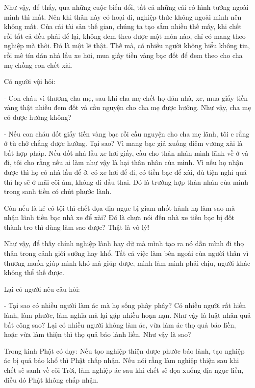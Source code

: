 \documentclass[
  12pt,
  oneside]{book}
\begin{document}
Như vậy, để thấy, qua những cuộc biến đổi, tất cả những cái có hình tướng ngoài mình thì mất. Nên khi thân này có hoại đi, nghiệp thức không ngoài mình nên không mất. Của cải tài sản thế gian, chúng ta tạo sắm nhiều thế mấy, khi chết rồi tất cả đều phải để lại, không đem theo được một món nào, chỉ có mang theo nghiệp mà thôi. Đó là một lẽ thật. Thế mà, có nhiều người không hiểu không tin, rồi mê tín dán nhà lầu xe hơi, mua giấy tiền vàng bạc đốt để đem theo cho cha mẹ chồng con chết xài.

Có người vội hỏi:

- Con cháu vì thương cha mẹ, sau khi cha mẹ chết họ dán nhà, xe, mua giấy tiền vàng thật nhiều đem đốt và cầu nguyện cho cha mẹ được hưởng. Như vậy, cha mẹ có được hưởng không?

- Nếu con cháu đốt giấy tiền vàng bạc rồi cầu nguyện cho cha mẹ lãnh, tôi e rằng ở tù chớ chẳng được hưởng. Tại sao? Vì mang bạc giả xuống diêm vương xài là bất hợp pháp. Nếu đốt nhà lầu xe hơi giấy, cầu cho thân nhân mình lãnh về ở và đi, tôi cho rằng nếu ai làm như vậy là hại thân nhân của mình. Vì nếu họ nhận được thì họ có nhà lầu để ở, có xe hơi để đi, có tiền bạc để xài, đủ tiện nghi quá thì họ sẽ ở mãi cõi âm, không đi đầu thai. Đó là trường hợp thân nhân của mình trong sanh tiền có chút phước lành.

Còn nếu là kẻ có tội thì chết đọa địa ngục bị giam nhốt hành hạ làm sao mà nhận lãnh tiền bạc nhà xe để xài? Đó là chưa nói đến nhà xe tiền bạc bị đốt thành tro thì dùng làm sao được? Thật là vô lý!

Như vậy, để thấy chính nghiệp lành hay dữ mà mình tạo ra nó dẫn mình đi thọ thân trong cảnh giới sướng hay khổ. Tất cả việc làm bên ngoài của người thân vì thương muốn giúp mình khó mà giúp được, mình làm mình phải chịu, người khác không thể thế được.

Lại có người nêu câu hỏi:

- Tại sao có nhiều người làm ác mà họ sống phây phây? Có nhiều người rất hiền lành, làm phước, làm nghĩa mà lại gặp nhiều hoạn nạn. Như vậy là luật nhân quả bất công sao? Lại có nhiều người không làm ác, vừa làm ác thọ quả báo liền, hoặc vừa làm thiện thì thọ quả báo lành liền. Như vậy là sao?

Trong kinh Phật có dạy: Nếu tạo nghiệp thiện được phước báo lành, tạo nghiệp ác bị quả báo khổ thì Phật chấp nhận. Nếu nói rằng làm nghiệp thiện sau khi chết sẽ sanh về cõi Trời, làm nghiệp ác sau khi chết sẽ đọa xuống địa ngục liền, điều đó Phật không chấp nhận.
\end{document}
